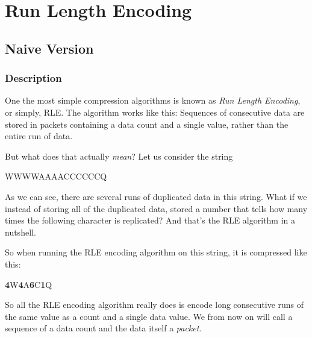 \begin{comment}
  
\end{comment}


\chapter{Run Length Encoding}
\label{sec:rle}

\begin{refsection}

\section{Naive Version}
\label{sec:naive-version}

\subsection{Description}
\label{sec:description}

One the most simple compression algorithms is known as \textit{Run
  Length Encoding}, or simply,
RLE\cite{nagarajan11:_enhan_approac_run_lengt_encod_schem}.
The algorithm works like this: Sequences of consecutive data are
stored in packets containing a data count and a single value, rather
than the entire run of data.

But what does that actually \textit{mean}? Let us consider the string

\begin{indentpar}
  WWWWAAAACCCCCCQ
\end{indentpar}

As we can see, there are several runs of duplicated data in this
string. What if we instead of storing all of the duplicated data,
stored a number that tells how many times the following character
is replicated? And that's the RLE algorithm in a nutshell.

So when running the RLE encoding algorithm on this string, it is
compressed like this:

\newcommand{\pkt}[2]{\textbf{#1}#2}

\begin{indentpar}
  \pkt{4}{W}\pkt{4}{A}\pkt{6}{C}\pkt{1}{Q}
\end{indentpar}

So all the RLE encoding algorithm really does is encode long
consecutive runs of the same value as a count and a single data
value. We from now on will call a sequence of a data count and the
data itself a \textit{packet}.


\end{refsection}
